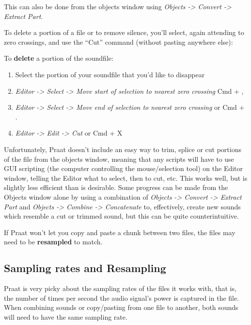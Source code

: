 \documentclass[11pt]{article}
\def\tightlist{}
\begin{document}
This can also be done from the objects window using \emph{Objects
-\textgreater{} Convert -\textgreater{} Extract Part}.

To delete a portion of a file or to remove silence, you'll select, again
attending to zero crossings, and use the ``Cut'' command (without
pasting anywhere else):

To \textbf{delete} a portion of the soundfile:

\begin{enumerate}
\def\labelenumi{\arabic{enumi}.}
\tightlist
\item
  Select the portion of your soundfile that you'd like to disappear
\item
  \emph{Editor -\textgreater{} Select -\textgreater{} Move start of
  selection to nearest zero crossing} Cmd + ,
\item
  \emph{Editor -\textgreater{} Select -\textgreater{} Move end of
  selection to nearest zero crossing} or Cmd + .
\item
  \emph{Editor -\textgreater{} Edit -\textgreater{} Cut} or Cmd + X
\end{enumerate}

Unfortunately, Praat doesn't include an easy way to trim, splice or cut
portions of the file from the objects window, meaning that any scripts
will have to use GUI scripting (the computer controlling the
mouse/selection tool) on the Editor window, telling the Editor what to
select, then to cut, etc. This works well, but is slightly less
efficient than is desirable. Some progress can be made from the Objects
window alone by using a combination of \emph{Objects -\textgreater{}
Convert -\textgreater{} Extract Part} and \emph{Objects -\textgreater{}
Combine -\textgreater{} Concatenate} to, effectively, create new sounds
which resemble a cut or trimmed sound, but this can be quite
counterintuitive.

If Praat won't let you copy and paste a chunk between two files, the
files may need to be \textbf{resampled} to match.

\hypertarget{sampling-rates-and-resampling}{%
\subsection{Sampling rates and
Resampling}\label{sampling-rates-and-resampling}}

\label{samplingrate}

Praat is very picky about the sampling rates of the files it works with,
that is, the number of times per second the audio signal's power is
captured in the file. When combining sounds or copy/pasting from one
file to another, both sounds will need to have the same sampling rate.
\end{document}

